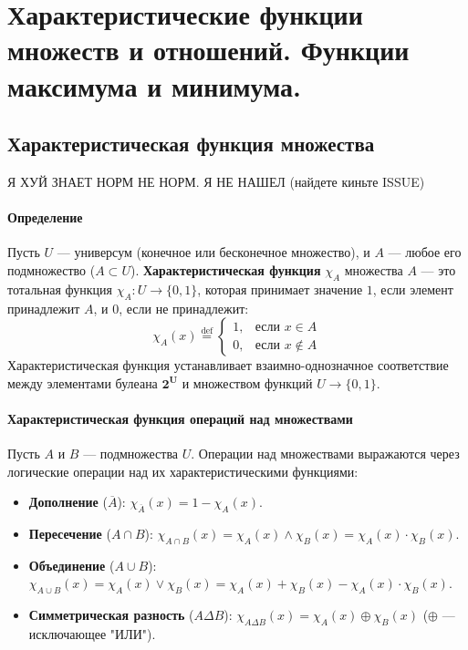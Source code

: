 \section{Характеристические функции множеств и отношений. Функции максимума и минимума.}

\subsection*{Характеристическая функция множества}
Я ХУЙ ЗНАЕТ НОРМ НЕ НОРМ. Я НЕ НАШЕЛ (найдете киньте ISSUE)
\paragraph{Определение}
Пусть $U$ --- универсум (конечное или бесконечное множество), и $A$ --- любое его подмножество ($A \subset U$). \textbf{Характеристическая функция} $\chi_A$ множества $A$ --- это тотальная функция $\chi_A: U \to \{0, 1\}$, которая принимает значение $1$, если элемент принадлежит $A$, и $0$, если не принадлежит:
$$\chi_A(x) \stackrel{\text{def}}{=} \begin{cases}
1, & \text{если } x \in A \\
0, & \text{если } x \notin A
\end{cases}$$
Характеристическая функция устанавливает взаимно-однозначное соответствие между элементами булеана $\mathbf{2^U}$ и множеством функций $U \to \{0, 1\}$.

\paragraph{Характеристическая функция операций над множествами}
Пусть $A$ и $B$ --- подмножества $U$. Операции над множествами выражаются через логические операции над их характеристическими функциями:

\begin{itemize}
    \item \textbf{Дополнение} ($\overline{A}$): $\chi_{\overline{A}}(x) = 1 - \chi_A(x)$.
    \item \textbf{Пересечение} ($A \cap B$): $\chi_{A \cap B}(x) = \chi_A(x) \land \chi_B(x) = \chi_A(x) \cdot \chi_B(x)$.
    \item \textbf{Объединение} ($A \cup B$): $\chi_{A \cup B}(x) = \chi_A(x) \lor \chi_B(x) = \chi_A(x) + \chi_B(x) - \chi_A(x)\cdot\chi_B(x)$.
    \item \textbf{Симметрическая разность} ($A \Delta B$): $\chi_{A \Delta B}(x) = \chi_A(x) \oplus \chi_B(x)$ ($\oplus$ --- исключающее "ИЛИ").
\end{itemize}

